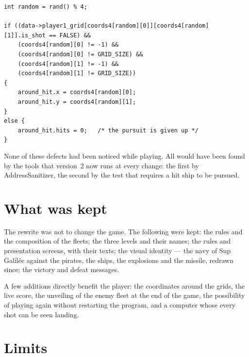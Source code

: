 \begin{lstlisting}[basicstyle=\ttfamily\footnotesize,
                   caption={Version~1: the cell is read before it is checked.},
                   label={lst-v1-bug}]
int random = rand() % 4;

if ((data->player1_grid[coords4[random][0]][coords4[random][1]].is_shot == FALSE) &&
    (coords4[random][0] != -1) &&
    (coords4[random][0] != GRID_SIZE) &&
    (coords4[random][1] != -1) &&
    (coords4[random][1] != GRID_SIZE))
{
    around_hit.x = coords4[random][0];
    around_hit.y = coords4[random][1];
}
else {
    around_hit.hits = 0;   /* the pursuit is given up */
}
\end{lstlisting}

None of these defects had been noticed while playing. All would have been found by the tools
that version~2 now runs at every change: the first by AddressSanitizer, the second by the
test that requires a hit ship to be pursued.

\section{What was kept}

The rewrite was not to change the game. The following were kept: the rules and the
composition of the fleets; the three levels and their names; the rules and presentation
screens, with their texts; the visual identity --- the navy of Sup Galilée against the
pirates, the ships, the explosions and the missile, redrawn since; the victory and defeat
messages.

A few additions directly benefit the player: the coordinates around the grids, the live
score, the unveiling of the enemy fleet at the end of the game, the possibility of playing
again without restarting the program, and a computer whose every shot can be seen landing.

\section{Limits}

